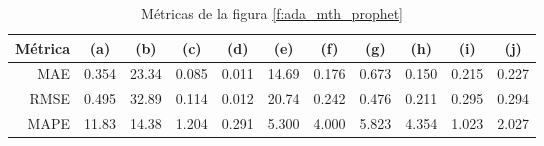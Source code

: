 \documentclass[a4paper,10pt]{article}
\begin{document}
\begin{table}[t]
 \begin{center}
  \begin{tabular}{|r|c|c|c|c|c|c|c|c|c|c|}
    Métrica & (a) & (b) & (c) & (d) & (e) & (f) & (g) & (h) & (i) & (j) \\ \hline
    MAE & 0.354 & 23.34 & 0.085 & 0.011 & 14.69 & 0.176 & 0.673 & 0.150 & 0.215 & 0.227 \\
    RMSE & 0.495 & 32.89 & 0.114 & 0.012 & 20.74 & 0.242 & 0.476 & 0.211 & 0.295 & 0.294 \\
    MAPE & 11.83 & 14.38 & 1.204 & 0.291 & 5.300 & 4.000 & 5.823 & 4.354 & 1.023 & 2.027 \\ \hline
  \end{tabular}
  \caption{Métricas de la figura \ref{f:ada_mth_prophet}}
  \label{tab:ada_prophet_m}
 \end{center}
\end{table}
\end{document}
